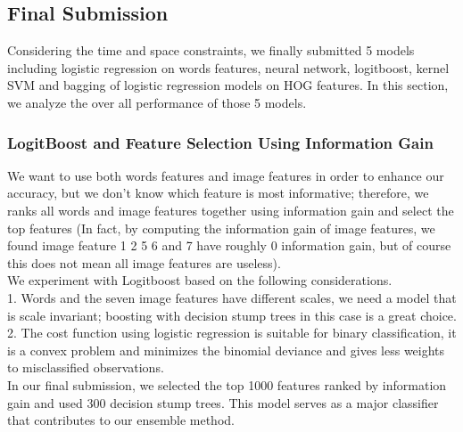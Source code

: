 \subsection{Final Submission}
Considering the time and space constraints, we finally submitted 5 models including logistic regression on words features, neural network, logitboost, kernel SVM and bagging of logistic regression models on HOG features. In this section, we analyze the over all performance of those 5 models.

\subsubsection{LogitBoost and Feature Selection Using Information Gain}
\label{logitboostFSIG}
 We want to use both words features and image features in order to enhance our accuracy, but we don't know which feature is most informative; therefore, we ranks all words and image features together using information gain and select the top features (In fact, by computing the information gain of image features, we found image feature 1 2 5 6 and 7 have roughly 0 information gain, but of course this does not mean all image features are useless).\\
We experiment with Logitboost based on the following considerations.\\
1. Words and the seven image features have different scales, we need a model that is scale invariant; boosting with decision stump trees in this case is a great choice.\\
2. The cost function using logistic regression is suitable for binary classification, it is a convex problem and minimizes the binomial deviance and gives less weights to misclassified observations.\\
In our final submission, we selected the top 1000 features ranked by information gain and used 300 decision stump trees. This model serves as a major classifier that contributes to our ensemble method.\\

